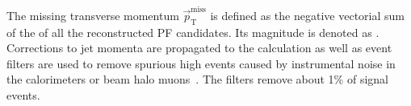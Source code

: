 The missing transverse momentum $\vec{p}_{\mathrm{T}}^{\mathrm{miss}}$ is defined as the negative vectorial sum of the \pt of all the reconstructed PF candidates. Its magnitude is denoted as \MET. Corrections to jet momenta are propagated to the \MET calculation as well as event filters \cite{CMS-PAS-JME-16-004} are used to remove spurious high \MET events caused by instrumental noise in the calorimeters or beam halo muons~\cite{CMS-PAS-JME-16-004}. The filters remove about 1\% of signal events.

